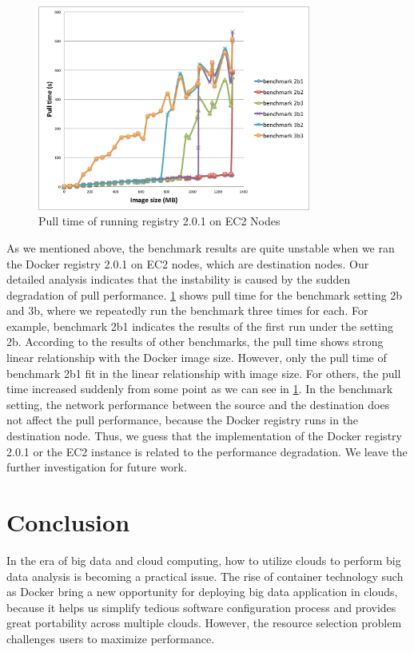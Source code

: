 \documentclass{ieicej}
\begin{document}
\begin{figure}
  \begin{center}
  \includegraphics[width=0.8\textwidth,natwidth=1000,natheight=800]{5_pull_time_of_running_docker_registry_2.0.1_on_EC2_nodes.pdf}
  \end{center}
  \caption{Pull time of running registry 2.0.1 on EC2 Nodes}
  \label{pull_time}
\end{figure}

As we mentioned above, the benchmark results are quite unstable when we ran the Docker registry 2.0.1 on EC2 nodes, which are destination nodes.
Our detailed analysis indicates that the instability is caused by the sudden degradation of pull performance.
\cref{pull_time} shows pull time for the benchmark setting 2b and 3b, where we repeatedly run the benchmark three times for each.
For example, benchmark 2b1 indicates the results of the first run under the setting 2b.
According to the results of other benchmarks, the pull time shows strong linear relationship with the Docker image size.
However, only the pull time of benchmark 2b1 fit in the linear relationship with image size.
For others, the pull time increased suddenly from some point as we can see in \cref{pull_time}.
In the benchmark setting, the network performance between the source and the destination does not affect the pull performance, because the Docker registry runs in the destination node.
Thus, we guess that the implementation of the Docker registry 2.0.1 or the EC2 instance is related to the performance degradation.
We leave the further investigation for future work.


\section{Conclusion}
In the era of big data and cloud computing, how to utilize clouds to perform big data analysis is becoming a practical issue. The rise of container technology such as Docker bring a new opportunity for deploying big data application in clouds, because it helps us simplify tedious software configuration process and provides great portability across multiple clouds. However, the resource selection problem challenges users to maximize performance.
\end{document}
